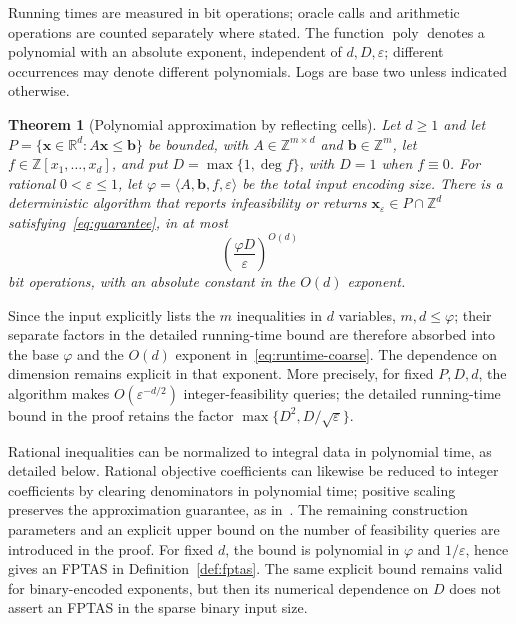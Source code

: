 \documentclass[11pt]{article}
\newtheorem{theorem}{Theorem}[section]
\theoremstyle{definition}\newtheorem{definition}{Definition}[section]
\theoremstyle{remark}\newtheorem{remark}[theorem]{Remark}
\newcommand{\R}{\mathbb R}\newcommand{\Q}{\mathbb Q}\newcommand{\Z}{\mathbb Z}
\newcommand{\eps}{\varepsilon}
\newcommand{\poly}{\operatorname{poly}}
\begin{document}
Running times are measured in bit operations; oracle calls and arithmetic operations are counted separately where stated. The function $\poly$ denotes a polynomial with an absolute exponent, independent of $d,D,\eps$; different occurrences may denote different polynomials. Logs are base two unless indicated otherwise.

\begin{theorem}[Polynomial approximation by reflecting cells]\label{thm:main}
Let $d\ge1$ and let $P=\{\mathbf{x}\in\R^d:A\mathbf{x}\le\mathbf b\}$ be bounded, with $A\in\Z^{m\times d}$ and $\mathbf b\in\Z^m$, let $f\in\Z[x_1,\ldots,x_d]$, and put $D=\max\{1,\deg f\}$, with $D=1$ when $f\equiv0$. For rational $0<\eps\le1$, let $\varphi=\langle A,\mathbf b,f,\eps\rangle$ be the total input encoding size.
There is a deterministic algorithm that reports infeasibility or returns $\mathbf{x}_{\eps}\in P\cap\Z^d$ satisfying~\eqref{eq:guarantee}, in at most
\begin{equation}\label{eq:runtime-coarse}
 \left(\frac{\varphi D}{\eps}\right)^{O(d)}
\end{equation}
bit operations, with an absolute constant in the $O(d)$ exponent.
\end{theorem}

Since the input explicitly lists the $m$ inequalities in $d$ variables, $m,d\le\varphi$; their separate factors in the detailed running-time bound are therefore absorbed into the base $\varphi$ and the $O(d)$ exponent in~\eqref{eq:runtime-coarse}. The dependence on dimension remains explicit in that exponent. More precisely, for fixed $P,D,d$, the algorithm makes $O(\eps^{-d/2})$ integer-feasibility queries; the detailed running-time bound in the proof retains the factor $\max\{D^2,D/\sqrt\eps\}$.

Rational inequalities can be normalized to integral data in polynomial time, as detailed below. Rational objective coefficients can likewise be reduced to integer coefficients by clearing denominators in polynomial time; positive scaling preserves the approximation guarantee, as in~\cite[Section~5]{DHKW08}. The remaining construction parameters and an explicit upper bound on the number of feasibility queries are introduced in the proof. For fixed $d$, the bound is polynomial in $\varphi$ and $1/\eps$, hence gives an FPTAS in Definition~\ref{def:fptas}. The same explicit bound remains valid for binary-encoded exponents, but then its numerical dependence on $D$ does not assert an FPTAS in the sparse binary input size.
\end{document}
